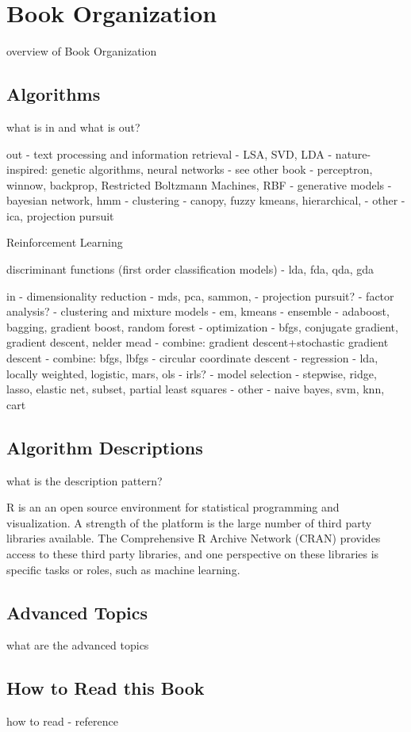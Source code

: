 
\section{Book Organization} 
\label{intro:organization}

overview of Book Organization



\subsection{Algorithms}

what is in and what is out?

out
- text processing and information retrieval
	- LSA, SVD, LDA
- nature-inspired: genetic algorithms, neural networks - see other book
	- perceptron, winnow, backprop, Restricted Boltzmann Machines, RBF
- generative models
	- bayesian network, hmm
- clustering
	- canopy, fuzzy kmeans, hierarchical, 
- other
	- ica, projection pursuit

Reinforcement Learning

discriminant functions (first order classification models)
- lda, fda, qda, gda

in
- dimensionality reduction
	- mds, pca, sammon, 
	- projection pursuit? 
	- factor analysis?
- clustering and mixture models
	- em, kmeans
- ensemble
	- adaboost, bagging, gradient boost, random forest
- optimization
	- bfgs, conjugate gradient, gradient descent, nelder mead
	- combine: gradient descent+stochastic gradient descent
	- combine: bfgs, lbfgs
	- circular coordinate descent
- regression
	- lda, locally weighted, logistic, mars, ols
	- irls?
- model selection
	- stepwise, ridge, lasso, elastic net, subset, partial least squares
- other
	- naive bayes, svm, knn, cart


\subsection{Algorithm Descriptions}

what is the description pattern?


R is an an open source environment for statistical programming and visualization. A strength of the platform is the large number of third party libraries available. The Comprehensive R Archive Network (CRAN) provides access to these third party libraries, and one perspective on these libraries is specific tasks or roles, such as machine learning.


\subsection{Advanced Topics}

what are the advanced topics


\subsection{How to Read this Book}

how to read - reference